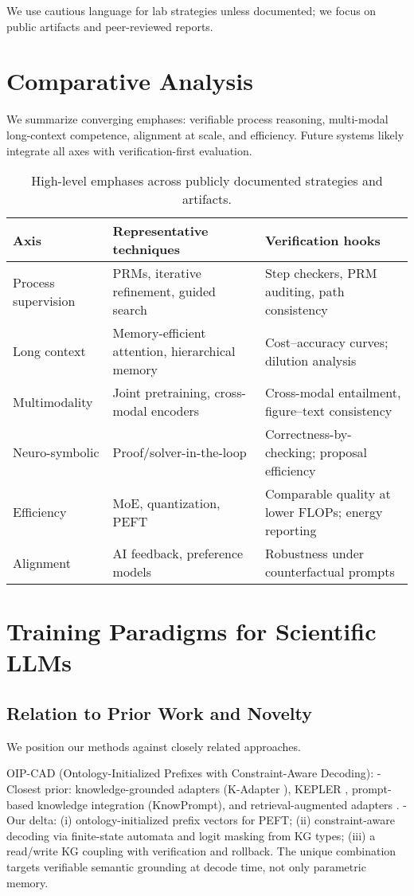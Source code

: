 \documentclass{article}
\begin{document}
We use cautious language for lab strategies unless documented; we focus on public artifacts and peer-reviewed reports.

\section{Comparative Analysis}
We summarize converging emphases: verifiable process reasoning, multi-modal long-context competence, alignment at scale, and efficiency. Future systems likely integrate all axes with verification-first evaluation.

\begin{table}[H]
\centering
\caption{High-level emphases across publicly documented strategies and artifacts.}
\label{tab:comparative_strategies}
\begin{tabular}{p{3.0cm} p{5.2cm} p{6.5cm}}
\toprule
Axis & Representative techniques & Verification hooks \\
\midrule
Process supervision & PRMs, iterative refinement, guided search & Step checkers, PRM auditing, path consistency \\
Long context & Memory-efficient attention, hierarchical memory & Cost–accuracy curves; dilution analysis \\
Multimodality & Joint pretraining, cross-modal encoders & Cross-modal entailment, figure–text consistency \\
Neuro-symbolic & Proof/solver-in-the-loop & Correctness-by-checking; proposal efficiency \\
Efficiency & MoE, quantization, PEFT & Comparable quality at lower FLOPs; energy reporting \\
Alignment & AI feedback, preference models & Robustness under counterfactual prompts \\
\bottomrule
\end{tabular}
\end{table}

\section{Training Paradigms for Scientific LLMs}
\subsection{Relation to Prior Work and Novelty}
We position our methods against closely related approaches.

OIP-CAD (Ontology-Initialized Prefixes with Constraint-Aware Decoding):
- Closest prior: knowledge-grounded adapters (K-Adapter \cite{wang2021kadapter}), KEPLER \cite{wang2021kepler}, prompt-based knowledge integration (KnowPrompt), and retrieval-augmented adapters \cite{shi2023retrievaladapters}.
- Our delta: (i) ontology-initialized prefix vectors for PEFT; (ii) constraint-aware decoding via finite-state automata and logit masking from KG types; (iii) a read/write KG coupling with verification and rollback. The unique combination targets verifiable semantic grounding at decode time, not only parametric memory.
\end{document}
